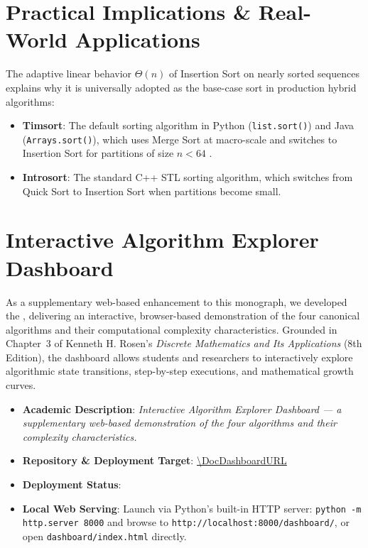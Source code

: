 \section{Practical Implications \& Real-World Applications}
The adaptive linear behavior $\Theta(n)$ of Insertion Sort on nearly sorted sequences explains why it is universally adopted as the base-case sort in production hybrid algorithms:
\begin{itemize}
    \item \textbf{Timsort}: The default sorting algorithm in Python (\texttt{list.sort()}) and Java (\texttt{Arrays.sort()}), which uses Merge Sort at macro-scale and switches to Insertion Sort for partitions of size $n < 64$ \cite{peters2002timsort}.
    \item \textbf{Introsort}: The standard C++ STL sorting algorithm, which switches from Quick Sort to Insertion Sort when partitions become small.
\end{itemize}

\section{Interactive Algorithm Explorer Dashboard}
\label{sec:dashboard_link}
As a supplementary web-based enhancement to this monograph, we developed the \textbf{\DocDashboardTitle{}}, delivering an interactive, browser-based demonstration of the four canonical algorithms and their computational complexity characteristics. Grounded in Chapter~3 of Kenneth H. Rosen's \emph{Discrete Mathematics and Its Applications} (8th Edition), the dashboard allows students and researchers to interactively explore algorithmic state transitions, step-by-step executions, and mathematical growth curves.

\begin{itemize}
    \item \textbf{Academic Description}: \emph{Interactive Algorithm Explorer Dashboard --- a supplementary web-based demonstration of the four algorithms and their complexity characteristics.}
    \item \textbf{Repository \& Deployment Target}: \url{\DocDashboardURL}
    \item \textbf{Deployment Status}: \texttt{\DocDashboardStatus}
    \item \textbf{Local Web Serving}: Launch via Python's built-in HTTP server: \texttt{python -m http.server 8000} and browse to \texttt{http://localhost:8000/dashboard/}, or open \texttt{dashboard/index.html} directly.
\end{itemize}


